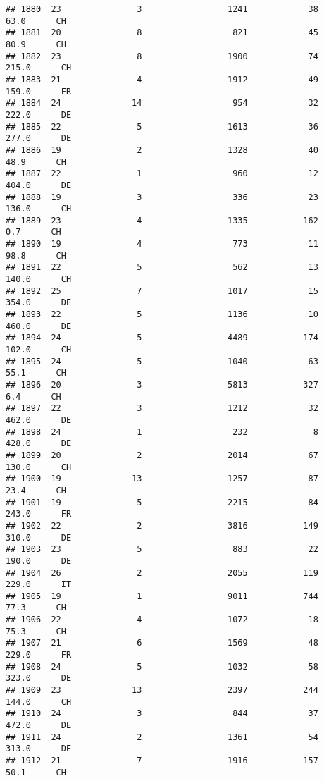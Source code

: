 \documentclass[
]{article}
\begin{document}
\begin{verbatim}
## 1880  23               3                 1241            38     63.0      CH
## 1881  20               8                  821            45     80.9      CH
## 1882  23               8                 1900            74    215.0      CH
## 1883  21               4                 1912            49    159.0      FR
## 1884  24              14                  954            32    222.0      DE
## 1885  22               5                 1613            36    277.0      DE
## 1886  19               2                 1328            40     48.9      CH
## 1887  22               1                  960            12    404.0      DE
## 1888  19               3                  336            23    136.0      CH
## 1889  23               4                 1335           162      0.7      CH
## 1890  19               4                  773            11     98.8      CH
## 1891  22               5                  562            13    140.0      CH
## 1892  25               7                 1017            15    354.0      DE
## 1893  22               5                 1136            10    460.0      DE
## 1894  24               5                 4489           174    102.0      CH
## 1895  24               5                 1040            63     55.1      CH
## 1896  20               3                 5813           327      6.4      CH
## 1897  22               3                 1212            32    462.0      DE
## 1898  24               1                  232             8    428.0      DE
## 1899  20               2                 2014            67    130.0      CH
## 1900  19              13                 1257            87     23.4      CH
## 1901  19               5                 2215            84    243.0      FR
## 1902  22               2                 3816           149    310.0      DE
## 1903  23               5                  883            22    190.0      DE
## 1904  26               2                 2055           119    229.0      IT
## 1905  19               1                 9011           744     77.3      CH
## 1906  22               4                 1072            18     75.3      CH
## 1907  21               6                 1569            48    229.0      FR
## 1908  24               5                 1032            58    323.0      DE
## 1909  23              13                 2397           244    144.0      CH
## 1910  24               3                  844            37    472.0      DE
## 1911  24               2                 1361            54    313.0      DE
## 1912  21               7                 1916           157     50.1      CH

\end{verbatim}
\end{document}
